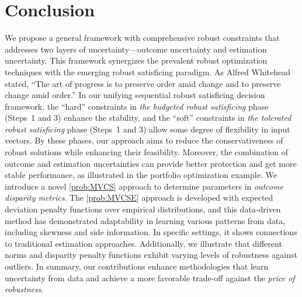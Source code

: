 \documentclass[opre, nonblindrev]{informswp}
\newcommand{\1}[1]{\mathds{1}{\left(#1\right)}}
\begin{document}
\section{Conclusion}
\label{sec:con}
We propose a general framework with comprehensive robust constraints that addresses two layers of uncertainty---outcome uncertainty and estimation uncertainty. This framework synergizes the prevalent robust optimization techniques with the emerging robust satisficing paradigm. As Alfred Whitehead stated, ``The art of progress is to preserve order amid change and to preserve change amid order.'' In our unifying sequential robust satisficing decision framework, the ``hard'' constraints in \emph{the budgeted robust satisficing} phase (Steps~1 and 3) enhance the stability, and the ``soft'' constraints in  \emph{the tolerated robust satisficing} phase (Steps~1 and 3) allow some degree of flexibility in input vectors. By these phases, our approach aims to reduce the conservativeness of robust solutions while enhancing their feasibility. Moreover, the combination of outcome and estimation uncertainties can provide better protection and get more stable performance, as illustrated in the portfolio optimization example. We introduce a novel \ref{prob:MVCS} approach to determine parameters in \emph{outcome disparity metrics}. The \ref{prob:MVCSE} approach is developed with expected deviation penalty functions over empirical distributions, and this data-driven method has demonstrated adaptability in learning various patterns from data, including skewness and side information. In specific settings, it shows connections to traditional estimation approaches. Additionally, we illustrate that different norms and disparity penalty functions exhibit varying levels of robustness against outliers. In summary, our contributions enhance methodologies that learn uncertainty from data and achieve a more favorable trade-off against the \emph{price of robustness}.




\end{document}

